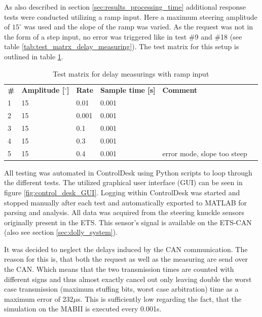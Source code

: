 \documentclass[ExampleMasters.tex]{subfiles}
\begin{document}


As also described in section \ref{sec:results_processing_time} additional response tests were conducted utilizing a ramp input. Here a maximum steering amplitude of $15^\circ $ was used and the slope of the ramp was varied. As the request was not in the form of a step input, no error was triggered like in test \#9 and \#18 (see table \ref{tab:test_matrx_delay_measuring}). The test matrix for this setup is outlined in table \ref{tab:test_matrx_ramp_input}. 

\begin{table}[h]
	\label{tab:test_matrx_ramp_input}
	\centering
\begin{tabular}{llllll}
 \textbf{\#} &\textbf{ Amplitude [$^\circ$]} & \textbf{Rate} & \textbf{Sample time [s]} & \textbf{Comment} &  \\ 
1	  &  15 & 0.01 & 0.001 &   \\ 
2	  & 15 & 0.001 &  0.001&  \\ 
3	  & 15 & 0.1 &  0.001&   \\ 
4	  & 15 & 0.3 & 	 0.001&   \\ 
5	  & 15 & 0.4 & 0.001 &  error mode, slope too steep\\ 

\end{tabular} 
\caption{Test matrix for delay measurings with ramp input}
\end{table}


All testing was automated in ControlDesk using Python scripts to loop through the different tests. The utilized graphical user interface (GUI) can be seen in figure \ref{fig:control_desk_GUI}. Logging within ControlDesk was started and stopped manually after each test and automatically exported to MATLAB for parsing and analysis. All data was acquired from the steering knuckle sensors originally present in the ETS. This sensor's signal is available on the ETS-CAN (also see section \ref{sec:dolly_system}). 

It was decided to neglect the delays induced by the CAN communication. The reason for this is, that both the request as well as the measuring are send over the CAN. Which means that the two transmission times are counted with different signs and thus almost exactly cancel out only leaving double the worst case transmission (maximum stuffing bits, worst case arbitration) time as a maximum error of 232$\mu$s. This is sufficiently low regarding the fact, that the simulation on the MABII is executed every 0.001s.     
\end{document}
